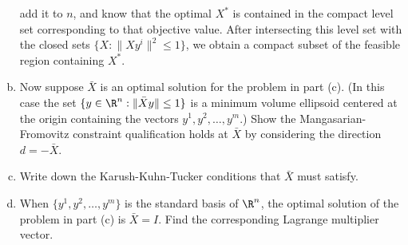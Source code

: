 \documentclass[../borwein-lewis_notes.tex]{subfiles}
\begin{document}
\begin{enumerate}[(a)]
{add it to $n$, and know that the optimal $X^*$ is contained in the 
compact level set corresponding to that objective value. After 
intersecting this level set with the closed sets $\{X: \|Xy^i\|^2 \leq 1\}
$, we obtain a compact subset of the feasible region containing $X^*$.
}
\item Now suppose $\bar X$ is an optimal solution for the problem in 
part (c). (In this case the set $\{y\in\R^n : \|\bar Xy\|\leq 1\}$ is a 
minimum volume ellipsoid centered at the origin containing the vectors 
$y^1,y^2,\ldots, y^m.$)
Show the Mangasarian-Fromovitz constraint qualification holds at $\bar X$ 
by considering the direction $d=-\bar X$. \\
\item Write down the Karush-Kuhn-Tucker conditions that $\bar X$ must 
satisfy.  \\
\item When $\{y^1, y^2, \ldots, y^m\}$ is the standard basis of $\R^n$, 
the optimal solution of the problem in part (c) is $\bar X=I$. Find the 
corresponding Lagrange multiplier vector. \\
\end{enumerate}
\end{document}
